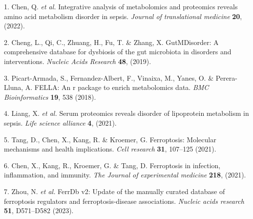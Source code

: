 \documentclass[
]{article}
\newenvironment{cslreferences}%
  {}%
  {\par}
\begin{document}
\hypertarget{refs}{}
\begin{cslreferences}
\leavevmode\hypertarget{ref-IntegrativeAnaChen2022}{}%
1. Chen, Q. \emph{et al.} Integrative analysis of metabolomics and proteomics reveals amino acid metabolism disorder in sepsis. \emph{Journal of translational medicine} \textbf{20}, (2022).

\leavevmode\hypertarget{ref-GutmdisorderACheng2019}{}%
2. Cheng, L., Qi, C., Zhuang, H., Fu, T. \& Zhang, X. GutMDisorder: A comprehensive database for dysbiosis of the gut microbiota in disorders and interventions. \emph{Nucleic Acids Research} \textbf{48}, (2019).

\leavevmode\hypertarget{ref-FellaAnRPacPicart2018}{}%
3. Picart-Armada, S., Fernandez-Albert, F., Vinaixa, M., Yanes, O. \& Perera-Lluna, A. FELLA: An r package to enrich metabolomics data. \emph{BMC Bioinformatics} \textbf{19}, 538 (2018).

\leavevmode\hypertarget{ref-SerumProteomicLiang2021}{}%
4. Liang, X. \emph{et al.} Serum proteomics reveals disorder of lipoprotein metabolism in sepsis. \emph{Life science alliance} \textbf{4}, (2021).

\leavevmode\hypertarget{ref-FerroptosisMoTang2021}{}%
5. Tang, D., Chen, X., Kang, R. \& Kroemer, G. Ferroptosis: Molecular mechanisms and health implications. \emph{Cell research} \textbf{31}, 107--125 (2021).

\leavevmode\hypertarget{ref-FerroptosisInChen2021}{}%
6. Chen, X., Kang, R., Kroemer, G. \& Tang, D. Ferroptosis in infection, inflammation, and immunity. \emph{The Journal of experimental medicine} \textbf{218}, (2021).

\leavevmode\hypertarget{ref-FerrdbV2UpdaZhou2023}{}%
7. Zhou, N. \emph{et al.} FerrDb v2: Update of the manually curated database of ferroptosis regulators and ferroptosis-disease associations. \emph{Nucleic acids research} \textbf{51}, D571--D582 (2023).
\end{cslreferences}
\end{document}
